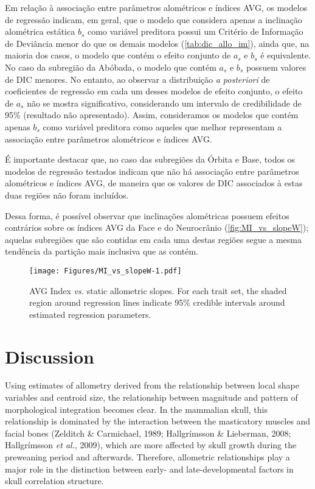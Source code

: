 \documentclass[12pt,]{article}
\begin{document}
Em relação à associação entre parâmetros alométricos e índices AVG, os
modelos de regressão indicam, em geral, que o modelo que considera
apenas a inclinação alométrica estática $b_s$ como variável preditora
possui um Critério de Informação de Deviância menor do que os demais
modelos (\autoref{tab:dic_allo_im}), ainda que, na maioria dos casos, o
modelo que contém o efeito conjunto de $a_s$ e $b_s$ é equivalente. No
caso da subregião da Abóbada, o modelo que contém $a_s$ e $b_s$ possuem
valores de DIC menores. No entanto, ao observar a distribuição \emph{a
posteriori} de coeficientes de regressão em cada um desses modelos de
efeito conjunto, o efeito de $a_s$ não se mostra significativo,
considerando um intervalo de credibilidade de 95\% (resultado não
apresentado). Assim, consideramos os modelos que contém apenas $b_s$
como variável preditora como aqueles que melhor representam a associação
entre parâmetros alométricos e índices AVG.

É importante destacar que, no caso das subregiões da Órbita e Base,
todos os modelos de regressão testados indicam que não há associação
entre parâmetros alométricos e índices AVG, de maneira que os valores de
DIC associados à estas duas regiões não foram incluídos.



Dessa forma, é possível observar que inclinações alométricas possuem
efeitos contrários sobre os índices AVG da Face e do Neurocrânio
(\autoref{fig:MI_vs_slopeW}); aquelas subregiões que são contidas em
cada uma destas regiões segue a mesma tendência da partição mais
inclusiva que as contém.

\begin{figure}[htbp]
\centering
\texttt{[image: Figures/MI\_vs\_slopeW-1.pdf]}
\caption{AVG Index \emph{vs.} static allometric slopes. For each trait
set, the shaded region around regression lines indicate 95\% credible
intervals around estimated regression parameters.
\label{fig:MI_vs_slopeW}}
\end{figure}

\section{Discussion}\label{discussion}

Using estimates of allometry derived from the relationship between local
shape variables and centroid size, the relationship between magnitude
and pattern of morphological integration becomes clear. In the mammalian
skull, this relationship is dominated by the interaction between the
masticatory muscles and facial bones (Zelditch \& Carmichael, 1989;
Hallgrímsson \& Lieberman, 2008; Hallgrímsson \emph{et al.}, 2009),
which are more affected by skull growth during the preweaning period and
afterwards. Therefore, allometric relationships play a major role in the
distinction between early- and late-developmental factors in skull
correlation structure.
\end{document}
